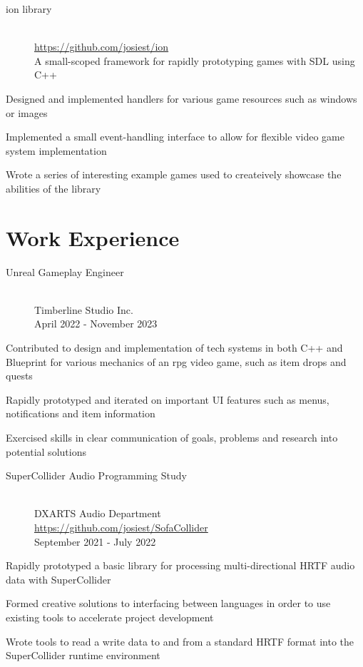 \documentclass[10pt]{article}
\newenvironment{itemize*}
{\begin{itemize}[leftmargin=*]
    \setlength{\parskip}{0.5pt}}
{\end{itemize}}
\begin{document}
\begin{paracol}{2}
\begin{description}
\item[ion library] \hfill \\
    \url{https://github.com/josiest/ion}\\
    A small-scoped framework for rapidly prototyping games with SDL using C++
\end{description}
\begin{itemize*}
\item Designed and implemented handlers for various game resources such
      as windows or images
\item Implemented a small event-handling interface to allow for flexible
      video game system implementation
\item Wrote a series of interesting example games used to createively showcase
      the abilities of the library
\end{itemize*}

\switchcolumn
\section*{Work Experience}

\begin{description}
\item[Unreal Gameplay Engineer] \hfill \\
    Timberline Studio Inc. \\
    April 2022 - November 2023
\end{description}
\begin{itemize*}
\item Contributed to design and implementation of tech systems in both C++ and Blueprint for various mechanics of an rpg video game, such as item drops and quests
\item Rapidly prototyped and iterated on important UI features such as menus, notifications and item information
\item Exercised skills in clear communication of goals, problems and research into potential solutions
\end{itemize*}

\begin{description}
\item[SuperCollider Audio Programming Study] \hfill \\
    DXARTS Audio Department\\
    \url{https://github.com/josiest/SofaCollider}\\
    September 2021 - July 2022
\end{description}
\begin{itemize*}
\item Rapidly prototyped a basic library for processing multi-directional HRTF audio data with SuperCollider
\item Formed creative solutions to interfacing between languages in order to
    use existing tools to accelerate project development
\item Wrote tools to read a write data to and from a standard HRTF format into
    the SuperCollider runtime environment
\end{itemize*}


\end{paracol}
\end{document}
